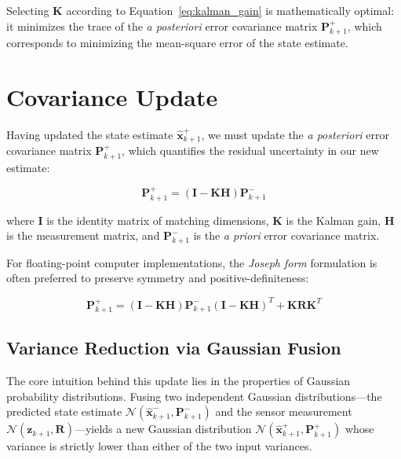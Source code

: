 \documentclass{article}
\begin{document}
	\noindent Selecting $\mathbf{K}$ according to Equation~\ref{eq:kalman_gain} is mathematically optimal: it minimizes the trace of the \emph{a posteriori} error covariance matrix $\mathbf{P}_{k+1}^+$, which corresponds to minimizing the mean-square error of the state estimate.	
	
	\section{Covariance Update}
	
	Having updated the state estimate $\hat{\mathbf{x}}_{k+1}^+$, we must update the \emph{a posteriori} error covariance matrix $\mathbf{P}_{k+1}^+$, which quantifies the residual uncertainty in our new estimate:
	
	\begin{equation}
		\mathbf{P}_{k+1}^+ = (\mathbf{I} - \mathbf{K} \mathbf{H}) \mathbf{P}_{k+1}^-
		\label{eq:cov_update}
	\end{equation}
	
	\noindent where $\mathbf{I}$ is the identity matrix of matching dimensions, $\mathbf{K}$ is the Kalman gain, $\mathbf{H}$ is the measurement matrix, and $\mathbf{P}_{k+1}^-$ is the \emph{a priori} error covariance matrix.
	
	For floating-point computer implementations, the \emph{Joseph form} formulation is often preferred to preserve symmetry and positive-definiteness:
	
	\begin{equation}
		\mathbf{P}_{k+1}^+ = (\mathbf{I} - \mathbf{K} \mathbf{H}) \mathbf{P}_{k+1}^- (\mathbf{I} - \mathbf{K} \mathbf{H})^T + \mathbf{K} \mathbf{R} \mathbf{K}^T
		\label{eq:cov_update_joseph}
	\end{equation}
	
	\subsection*{Variance Reduction via Gaussian Fusion}
	
	The core intuition behind this update lies in the properties of Gaussian probability distributions. Fusing two independent Gaussian distributions—the predicted state estimate $\mathcal{N}(\hat{\mathbf{x}}_{k+1}^-, \mathbf{P}_{k+1}^-)$ and the sensor measurement $\mathcal{N}(\mathbf{z}_{k+1}, \mathbf{R})$—yields a new Gaussian distribution $\mathcal{N}(\hat{\mathbf{x}}_{k+1}^+, \mathbf{P}_{k+1}^+)$ whose variance is strictly lower than either of the two input variances. 
	
\end{document}
